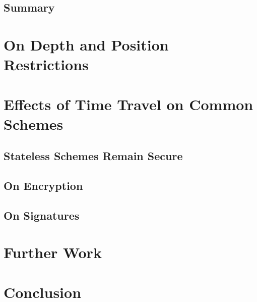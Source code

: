 \subsection{Summary}

\section{On Depth and Position Restrictions}

\section{Effects of Time Travel on Common Schemes}

\subsection{Stateless Schemes Remain Secure}

\subsection{On Encryption}

\subsection{On Signatures}

\section{Further Work}

\section{Conclusion}


\small 

